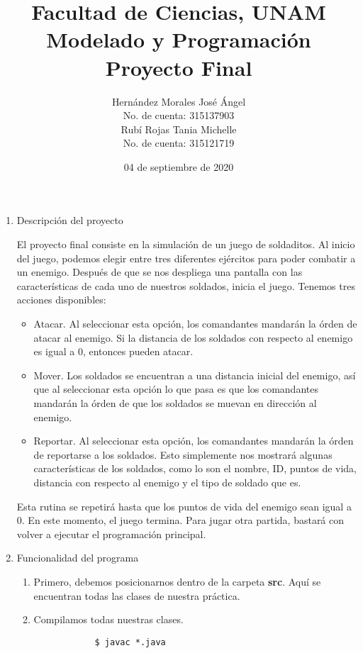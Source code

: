 \documentclass[letterpaper,11pt]{article}
\title{Facultad de Ciencias, UNAM \\ Modelado y Programación \\ Proyecto Final}
\author{Hernández Morales José Ángel \\ No. de cuenta: 315137903 \\ 
        Rubí Rojas Tania Michelle \\ No. de cuenta: 315121719}
\date{04 de septiembre de 2020}
\begin{document}
\maketitle

\begin{enumerate}
    \item Descripción del proyecto

    El proyecto final consiste en la simulación de un juego de soldaditos. Al 
    inicio del juego, podemos elegir entre tres diferentes ejércitos para poder 
    combatir a un enemigo. Después de que se nos despliega una pantalla con las 
    características de cada uno de nuestros soldados, inicia el juego. Tenemos 
    tres acciones disponibles:
    \begin{itemize}
        \item Atacar. Al seleccionar esta opción, los comandantes mandarán la 
        órden de atacar al enemigo. Si la distancia de los soldados con respecto 
        al enemigo es igual a $0$, entonces pueden atacar.

        \item Mover. Los soldados se encuentran a una distancia inicial del 
        enemigo, así que al seleccionar esta opción lo que pasa es que los 
        comandantes mandarán la órden de que los soldados se muevan en dirección 
        al enemigo.

        \item Reportar. Al seleccionar esta opción, los comandantes mandarán la 
        órden de reportarse a los soldados. Esto simplemente nos mostrará algunas 
        características de los soldados, como lo son el nombre, ID, puntos de vida,
        distancia con respecto al enemigo y el tipo de soldado que es.
    \end{itemize}

    Esta rutina se repetirá hasta que los puntos de vida del enemigo sean igual 
    a $0$. En este momento, el juego termina. Para jugar otra partida, bastará 
    con volver a ejecutar el programación principal.

    \item Funcionalidad del programa
    \begin{enumerate}
        \item Primero, debemos posicionarnos dentro de la carpeta \textbf{src}.
        Aquí se encuentran todas las clases de nuestra práctica.

        \item Compilamos todas nuestras clases.
        \begin{verbatim}
            $ javac *.java
        \end{verbatim}


\end{enumerate}
\end{enumerate}
\end{document}
